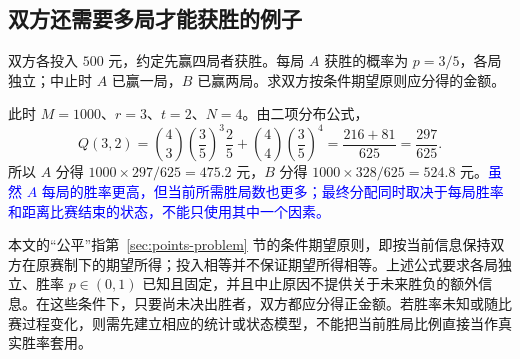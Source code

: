\documentclass[UTF8,12pt,a4paper,fontset=fandol]{ctexart}
\begin{document}
\subsection{双方还需要多局才能获胜的例子}

\begin{example}[四胜制下的不等胜率分配]
\label{ex:points-biased}
双方各投入 $500$ 元，约定先赢四局者获胜。每局 $A$ 获胜的概率为 $p=3/5$，各局独立；中止时 $A$ 已赢一局，$B$ 已赢两局。求双方按条件期望原则应分得的金额。
\end{example}

\begin{solve}
此时 $M=1000$、$r=3$、$t=2$、$N=4$。由二项分布公式，
\[
  Q(3,2)=\binom43\left(\frac35\right)^3\frac25
          +\binom44\left(\frac35\right)^4
        =\frac{216+81}{625}=\frac{297}{625}.
\]
所以 $A$ 分得 $1000\times297/625=475.2$ 元，$B$ 分得 $1000\times328/625=524.8$ 元。\textcolor{blue}{虽然 $A$ 每局的胜率更高，但当前所需胜局数也更多；最终分配同时取决于每局胜率和距离比赛结束的状态，不能只使用其中一个因素。}
\end{solve}

本文的“公平”指第~\ref{sec:points-problem} 节的条件期望原则，即按当前信息保持双方在原赛制下的期望所得；投入相等并不保证期望所得相等。上述公式要求各局独立、胜率 $p\in(0,1)$ 已知且固定，并且中止原因不提供关于未来胜负的额外信息。在这些条件下，只要尚未决出胜者，双方都应分得正金额。若胜率未知或随比赛过程变化，则需先建立相应的统计或状态模型，不能把当前胜局比例直接当作真实胜率套用。
\end{document}

